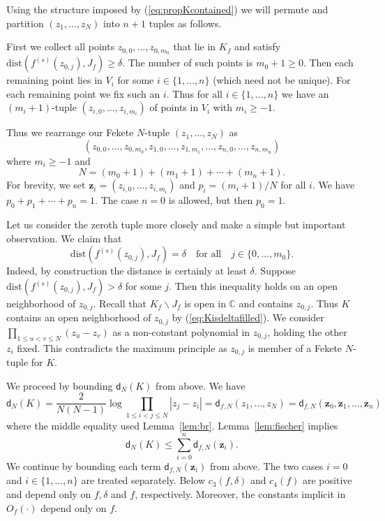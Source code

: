 \documentclass[12pt,oneside,a4]{amsart}
\newcommand{\IC}{\mathbb{C}}
\numberwithin{maincounter}{section}
\numberwithin{equation}{section}
\newcommand{\ssm}{\smallsetminus}
\newcommand{\bfz}{\boldsymbol{z}}
\begin{document}
Using the structure imposed by  (\ref{eq:propKcontained}) we will
permute and partition $(z_1,\ldots,z_N)$
into $n+1$ tuples as follows.

First we collect all points $z_{0,0},\ldots,z_{0,m_0}$ that lie in
$K_f$
and satisfy 
$\mathrm{dist}(f^{(s)}(z_{0,j}),J_f)\ge \delta$.
The number of such points is $m_0+1\ge 0$.
Then each remaining point lies in ${V_i}$ for some
$i\in\{1,\ldots,n\}$  (which need not be unique).
For each remaining point we fix such an $i$.
Thus for all $i\in \{1,\ldots,n\}$ we have an $(m_i+1)$-tuple
$(z_{i,0},\ldots,z_{i,m_i})$ of points in ${V_i}$ with $m_i\ge -1$.

Thus we rearrange our Fekete $N$-tuple $(z_1,\ldots,z_N)$ as
\begin{equation*}
  \left(z_{0,0},\ldots,z_{0,m_0},z_{1,0},\ldots,z_{1,m_1},\ldots,
    z_{n,0},\ldots,z_{n,m_n}\right)
\end{equation*}
where $m_i \ge -1$ and
\begin{equation*}
  N = (m_0+1) + (m_1+1)+\cdots +(m_n+1). 
\end{equation*}
For brevity, we set $\bfz_i = (z_{i,0},\ldots,z_{i,m_i})$ and 
$p_i = (m_i+1)/N$ for all $i$. We have
$p_0+p_1+\cdots+p_n=1$. The case $n=0$ is allowed, but then $p_0=1$. 


Let us consider the zeroth tuple more closely and make a simple but
important observation.  We claim that
\begin{equation}
  \label{eq:crucialcommentmaxmod}
  \mathrm{dist}(f^{(s)}(z_{0,j}),J_f)=\delta\quad\text{for all}\quad j\in
  \{0,\ldots,m_0\}. 
\end{equation}
Indeed, by construction the distance is certainly at least $\delta$. 
Suppose  $\mathrm{dist}(f^{(s)}(z_{0,j}),J_f)>\delta$ for some $j$.
Then this inequality holds on an 
open neighborhood of $z_{0,j}$.
Recall that $K_f\ssm J_f$ is 
open in $\IC$ and contains $z_{0,j}$.
Thus $K$ contains an open neighborhood
of $z_{0,j}$ by (\ref{eq:Kisdeltafilled}). We consider
$\prod_{1\le u<v\le N}(z_u-z_v)$ as a non-constant polynomial in
$z_{0,j}$, holding the other $z_i$ fixed.
This contradicts the maximum principle as $z_{0,j}$ is
member of a Fekete $N$-tuple for $K$.





We proceed by bounding $\mathsf{d}_N(K)$ from above. We have
\begin{equation}
  \label{eq:DNKsumbound}
  \mathsf{d}_N(K)=\frac{2}{N(N-1)} \log\prod_{1\le i<j\le N} |z_j-z_i|
  = \mathsf{d}_{f,N}(z_1,\ldots,z_N)=\mathsf{d}_{f,N}(\bfz_0,\bfz_1,\ldots,\bfz_n)
\end{equation}
where the middle equality used Lemma~\ref{lem:br}.
Lemma~\ref{lem:fischer} implies
\begin{equation}
  \label{eq:bakerchangeofcoordinates}
  \mathsf{d}_N(K) \le \sum_{i=0}^n \mathsf{d}_{f,N}(\bfz_i). 
\end{equation}
We continue by bounding each term $\mathsf{d}_{f,N}(\bfz_i)$  from above. The two cases $i=0$ and
$i\in \{1,\ldots,n\}$ are treated separately. 
Below $c_3(f,\delta)$ and $c_4(f)$ are positive and depend only on
$f,\delta$ and $f$, respectively. Moreover, the constants implicit in
$O_f(\cdot)$ depend only on $f$.
\end{document}
